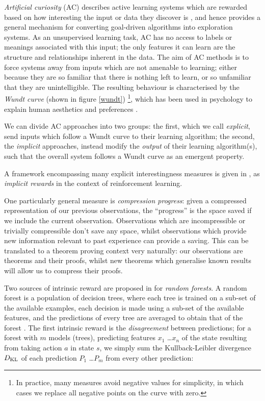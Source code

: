 \documentclass[]{article}
\begin{document}
\emph{Artificial curiosity} (AC) describes active learning systems which are rewarded based on how interesting the input or data they discover is \cite{schmidhuber2006developmental}, and hence provides a general mechanism for converting goal-driven algorithms into exploration systems. As an unsupervised learning task, AC has no access to labels or meanings associated with this input; the only features it can learn are the structure and relationships inherent in the data. The aim of AC methods is to force systems away from inputs which are not amenable to learning; either because they are so familiar that there is nothing left to learn, or so unfamiliar that they are unintelligible. The resulting behaviour is characterised by the \emph{Wundt curve} (shown in figure \ref{wundt}) \footnote{In practice, many measures avoid negative values for simplicity, in which cases we replace all negative points on the curve with zero.}, which has been used in psychology to explain human aesthetics and preferences \cite{berlyne1970novelty}.

We can divide AC approaches into two groups: the first, which we call \emph{explicit}, send inputs which follow a Wundt curve to their learning algorithm; the second, the \emph{implicit} approaches, instead modify the \emph{output} of their learning algorithm(s), such that the overall system follows a Wundt curve as an emergent property.

A framework encompassing many explicit interestingness measures is given in \cite{oudeyer2007intrinsic}, as \emph{implicit rewards} in the context of reinforcement learning.

One particularly general measure is \emph{compression progress}: given a compressed representation of our previous observations, the ``progress'' is the space saved if we include the current observation. Observations which are incompressible or trivially compressible don't save any space, whilst observations which provide new information relevant to past experience can provide a saving. This can be translated to a theorem proving context very naturally: our observations are theorems and their proofs, whilst new theorems which generalise known results will allow us to compress their proofs.

\cite{Schmidhuber1999}

Two sources of intrinsic reward are proposed in \cite{Hester.Stone:2012} for \emph{random forests}. A random forest is a population of decision trees, where each tree is trained on a sub-set of the available examples, each decision is made using a sub-set of the available features, and the predictions of every tree are averaged to obtain that of the forest \cite{randomforests}. The first intrinsic reward is the \emph{disagreement} between predictions; for a forest with $m$ models (trees), predicting features $x_1$ \dots $x_n$ of the state resulting from taking action $a$ in state $s$, we simply sum the Kullback-Leibler divergence $D_{\rm KL}$ of each prediction $P_1$ \dots $P_m$ from every other prediction:
\end{document}
